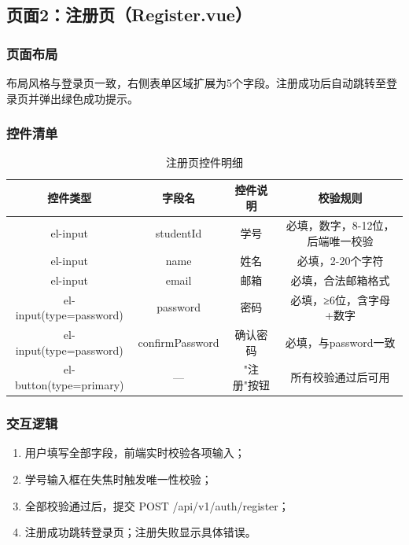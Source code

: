 \documentclass{../softeng}
\begin{document}
\subsection{页面2：注册页（Register.vue）}

\subsubsection{页面布局}
布局风格与登录页一致，右侧表单区域扩展为5个字段。注册成功后自动跳转至登录页并弹出绿色成功提示。

\subsubsection{控件清单}
\begin{table}[htbp]
    \centering
    \caption{注册页控件明细}
    \begin{tabular}{|c|c|c|c|}
        \hline
        \textbf{控件类型} & \textbf{字段名} & \textbf{控件说明} & \textbf{校验规则} \\
        \hline
        el-input & studentId & 学号 & 必填，数字，8-12位，后端唯一校验 \\
        \hline
        el-input & name & 姓名 & 必填，2-20个字符 \\
        \hline
        el-input & email & 邮箱 & 必填，合法邮箱格式 \\
        \hline
        el-input(type=password) & password & 密码 & 必填，≥6位，含字母+数字 \\
        \hline
        el-input(type=password) & confirmPassword & 确认密码 & 必填，与password一致 \\
        \hline
        el-button(type=primary) & — & "注 册"按钮 & 所有校验通过后可用 \\
        \hline
    \end{tabular}
\end{table}

\subsubsection{交互逻辑}
\begin{enumerate}
    \item 用户填写全部字段，前端实时校验各项输入；
    \item 学号输入框在失焦时触发唯一性校验；
    \item 全部校验通过后，提交 POST /api/v1/auth/register；
    \item 注册成功跳转登录页；注册失败显示具体错误。
\end{enumerate}
\end{document}
